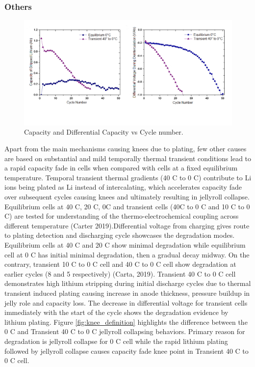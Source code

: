 \documentclass{article}
\begin{document}
\subsubsection{Others}

\begin{figure}[ht]
\centering
\includegraphics[scale = 0.7]{images/Capacity & Diff Voltage.png}
\caption{Capacity and Differential Capacity vs Cycle number.}
\label{fig:CapDiffCapCycle}
\end{figure}

Apart from the main mechanisms causing knees due to plating, few other causes are based on substantial and mild temporally thermal transient conditions lead to a rapid capacity fade in cells when compared with cells at a fixed equilibrium temperature. Temporal transient thermal gradients (40 \degree C to 0 \degree C) contribute to Li ions being plated as Li instead of intercalating, which accelerates capacity fade over subsequent cycles causing knees and ultimately resulting in jellyroll collapse.
Equilibrium cells at 40 \degree C, 20 \degree C, 0\degree C and transient cells (40\degree C to 0 \degree C and 10 \degree C to 0 \degree C) are tested for understanding of the thermo-electrochemical coupling across different temperature (Carter 2019).Differential voltage from charging gives route to plating detection and discharging cycle showcases the degradation modes. Equilibrium cells at 40 \degree C and 20 \degree C show minimal degradation while equilibrium cell at 0 \degree C has initial minimal degradation, then a gradual decay midway. On the contrary, transient 10 \degree C to 0 \degree C cell and 40 \degree C to 0 \degree C cell show degradation at earlier cycles (8 and 5 respectively) (Carta, 2019). Transient 40 \degree C to 0 \degree C cell demonstrates high lithium stripping during initial discharge cycles due to thermal transient induced plating causing increase in anode thickness, pressure buildup in jelly role and capacity loss. The decrease in differential voltage for transient cells immediately with the start of the cycle shows the degradation evidence by lithium plating.  Figure \ref{fig:knee_definition} highlights the difference between the 0 \degree C and Transient 40 \degree C to 0 \degree C jellyroll collapsing behaviors. Primary reason for degradation is jellyroll collapse for 0 \degree C cell while the rapid lithium plating followed by jellyroll collapse causes capacity fade knee point in Transient 40 \degree C to 0 \degree C cell. 
\end{document}
